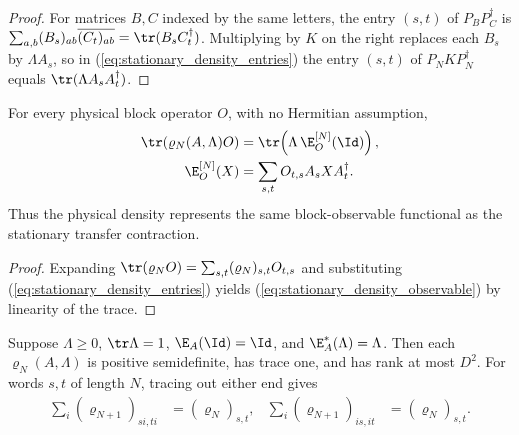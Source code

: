 \begin{proof}
    \leanok
    For matrices $B,C$ indexed by the same letters, the entry $(s,t)$ of
    $P_BP_C^\dagger$ is $\sum_{a,b}(B_s)_{ab}\overline{(C_t)_{ab}}
        =\tr(B_sC_t^\dagger)$. Multiplying by $K$ on the right replaces each
    $B_s$ by $\Lambda A_s$, so in (\ref{eq:stationary_density_entries}) the
    entry $(s,t)$ of $P_NKP_N^\dagger$ equals $\tr(\Lambda A_sA_t^\dagger)$.
\end{proof}

\begin{lemma}
    \label{thm:stationary_density_observable}
    \leanok
    For every physical block operator $O$, with no Hermitian assumption,
    \begin{align}
        \tr(\varrho_N(A,\Lambda)O)
         & =\tr\!\left(\Lambda\,\E_O^{[N]}(\Id)\right),
        \label{eq:stationary_density_observable}        \\
        \E_O^{[N]}(X)
         & =\sum_{s,t}O_{t,s}A_sXA_t^\dagger.
        \notag
    \end{align}
    Thus the physical density represents the same block-observable
    functional as the stationary transfer contraction.
\end{lemma}

\begin{proof}
    \leanok
    Expanding $\tr(\varrho_NO)=\sum_{s,t}(\varrho_N)_{s,t}O_{t,s}$ and
    substituting (\ref{eq:stationary_density_entries}) yields
    (\ref{eq:stationary_density_observable}) by linearity of the trace.
\end{proof}

\begin{lemma}
    \label{thm:stationary_density_consistency}
    \leanok
    Suppose $\Lambda\geq0$, $\tr\Lambda=1$, $\E_A(\Id)=\Id$, and
    $\E_A^*(\Lambda)=\Lambda$. Then each $\varrho_N(A,\Lambda)$ is positive
    semidefinite, has trace one, and has rank at most $D^2$.
    For words $s,t$ of length $N$, tracing out either end gives
    \begin{align}
        \sum_i(\varrho_{N+1})_{si,ti}
         & =(\varrho_N)_{s,t}, &
        \sum_i(\varrho_{N+1})_{is,it}
         & =(\varrho_N)_{s,t}.
        \label{eq:stationary_density_marginals}
    \end{align}
\end{lemma}

